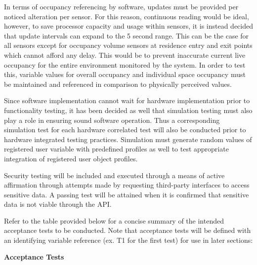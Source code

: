 \documentclass{article}
\begin{document}
In terms of occupancy referencing by software, updates must be provided per noticed alteration per sensor. For this reason, continuous reading would be ideal, however, to save processor capacity and usage within sensors, it is instead decided that update intervals can expand to the 5 second range. This can be the case for all sensors except for occupancy volume sensors at residence entry and exit points which cannot afford any delay. This would be to prevent inaccurate current live occupancy for the entire environment monitored by the system. In order to test this, variable values for overall occupancy and individual space occupancy must be maintained and referenced in comparison to physically perceived values.

Since software implementation cannot wait for hardware implementation prior to functionality testing, it has been decided as well that simulation testing must also play a role in ensuring sound software operation. Thus a corresponding simulation test for each hardware correlated test will also be conducted prior to hardware integrated testing practices. Simulation must generate random values of registered user variable with predefined profiles as well to test appropriate integration of registered user object profiles.

Security testing will be included and executed through a means of active affirmation through attempts made by requesting third-party interfaces to access sensitive data. A passing test will be attained when it is confirmed that sensitive data is not viable through the \gls{API}. 

Refer to the table provided below for a concise summary of the intended acceptance tests to be conducted. Note that acceptance tests will be defined with an identifying variable reference (ex. T1 for the first test) for use in later sections:

\begin{flushleft}
\large
{}
\textbf{Acceptance Tests}
\end{flushleft}
\end{document}
